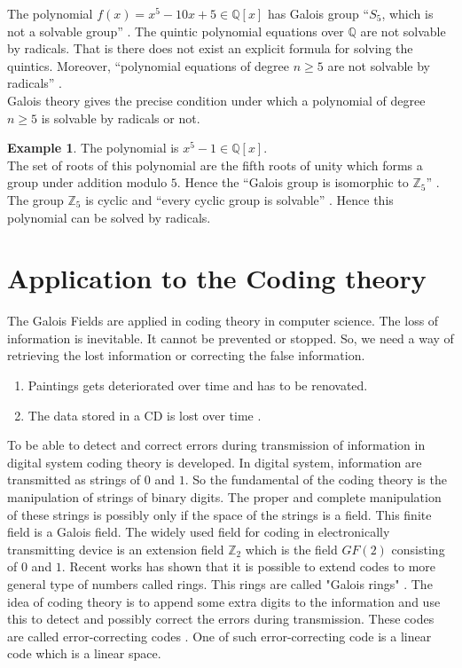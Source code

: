 \documentclass[a4paper,twoside,10pt]{article}
\theoremstyle{plain}
\theoremstyle{definition}
\newtheorem{example}[theorem]{Example}
\begin{document}
\noindent
The polynomial \(f(x)=x^5-10x+5 \in \mathbb{Q}[x]\) has Galois group ``\(S_5\), which is not a solvable group'' \cite{hunger}. The quintic polynomial equations over \(\mathbb{Q}\) are not solvable by radicals. That is there does not exist an explicit formula for solving the quintics. Moreover, ``polynomial equations of degree \(n \geq 5\) are not solvable by radicals'' \cite{hunger}.\\[2mm]

\noindent
Galois theory gives the precise condition under which a polynomial of degree \(n \geq 5\) is solvable by radicals or not.
\begin{example}
  The polynomial is \(x^5-1 \in \mathbb{Q}[x]\).\\
  The set of  roots of this polynomial are the fifth roots of unity which forms a group under addition modulo \(5\). Hence the ``Galois group is isomorphic to \(\mathbb{Z}_5\)'' \cite{hunger}. The group \(\mathbb{Z}_5\) is cyclic and ``every cyclic group is solvable'' \cite{galois}. Hence this polynomial can be  solved by radicals.
\end{example}

\section{Application to the Coding theory}
The Galois Fields are applied in coding theory in computer science. The loss of information is inevitable. It cannot be prevented or stopped. So, we need a way of retrieving the lost information or correcting the false information.

\begin{enumerate}
\item Paintings gets deteriorated over time and has to be renovated.
\item The data stored in a CD is lost over time \cite{coding}.
\end{enumerate}

\noindent
To be able to detect and correct errors during transmission of information in digital system coding theory is developed. In digital system, information are transmitted as strings of \(0\) and \(1\). So the fundamental of the coding theory is the manipulation of strings of binary digits. The proper and complete manipulation of these strings is possibly only if the space of the strings is a field. This finite field is a Galois field. The widely used field for coding in electronically transmitting device is an extension field \({\mathbb{Z}}_2\) which is the field \(GF(2)\) consisting of \(0\) and \(1\). Recent works has shown that it is possible to extend codes to more general type of numbers called rings. This rings are called "Galois rings" \cite{error_correct}. The idea of coding theory is to append some extra digits to the information and use this to detect and possibly correct the errors during transmission. These codes are called error-correcting codes \cite{coding}. One of such error-correcting code is a linear code which is a linear space.
\end{document}
